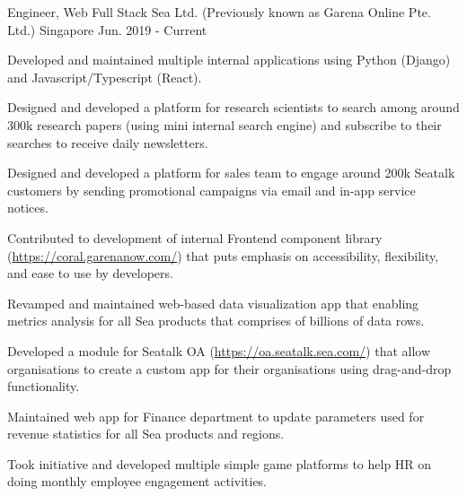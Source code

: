 

\begin{cventries}

  \cventry
    {Engineer, Web Full Stack} %
    {Sea Ltd. (Previously known as Garena Online Pte. Ltd.)} %
    {Singapore} %
    {Jun. 2019 - Current} %
    {
      \begin{cvitems} %
        \item {Developed and maintained multiple internal applications using Python (Django) and Javascript/Typescript (React).}
        \item {Designed and developed a platform for research scientists to search among around 300k research papers (using mini internal search engine) and subscribe to their searches to receive daily newsletters.}
        \item {Designed and developed a platform for sales team to engage around 200k Seatalk customers by sending promotional campaigns via email and in-app service notices.}
        \item {Contributed to development of internal Frontend component library (\url{https://coral.garenanow.com/}) that puts emphasis on accessibility, flexibility, and ease to use by developers.}
        \item {Revamped and maintained web-based data visualization app that enabling metrics analysis for all Sea products that comprises of billions of data rows.}
        \item {Developed a module for Seatalk OA (\url{https://oa.seatalk.sea.com/}) that allow organisations to create a custom app for their organisations using drag-and-drop functionality.}
        \item {Maintained web app for Finance department to update parameters used for revenue statistics for all Sea products and regions.}
        \item {Took initiative and developed multiple simple game platforms to help HR on doing monthly employee engagement activities.}
      \end{cvitems}
    }


\end{cventries}
